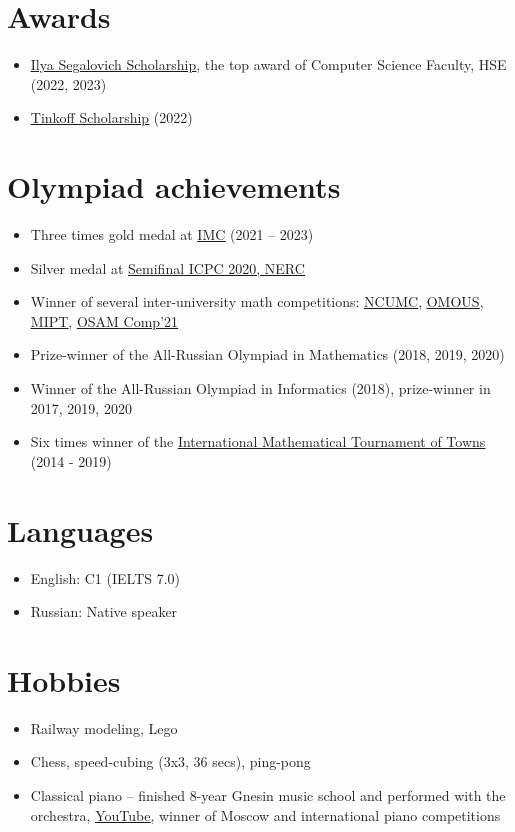 \documentclass[letterpaper,11pt]{article}
\newcommand{\resumeItemListStart}{\begin{itemize}}
\newcommand{\resumeItemListEnd}{\end{itemize}\vspace{-8pt}}
\newcommand{\resumeItem}[1]{\item\small{{#1 \vspace{-2pt}}}}
\newcommand{\resumeSubItem}[1]{\resumeItem{#1}\vspace{-4pt}}
\begin{document}
\section{Awards}

\resumeItemListStart
\resumeSubItem{\href{https://cs.hse.ru/en/stipend}{\underline{Ilya Segalovich Scholarship}}, the top award of Computer Science Faculty, HSE (2022, 2023)}
\resumeSubItem{\href{https://www.tinkoff.ru/about/news/06042022-tinkoff-launches-scholarship-programme-for-russias-young-talent-eng/}{\underline{Tinkoff Scholarship}} (2022)}
\resumeItemListEnd


\section{Olympiad achievements}

\resumeItemListStart
\resumeSubItem{Three times gold medal at \href{https://imc-math.org.uk}{\underline{IMC}} (2021 -- 2023)}
\resumeSubItem{Silver medal at \href{https://neerc.ifmo.ru/archive/2020.html}{\underline{Semifinal ICPC 2020, NERC}}}
\resumeSubItem{Winner of several inter-university math competitions: \href{https://iuhd.edu.tm/competition/44}{\underline{NCUMC}}, \href{https://iuhd.edu.tm/competition/45}{\underline{OMOUS}}, \href{http://www.rkarasev.ru/note/66}{\underline{MIPT}}, \href{https://cs.hse.ru/en/announcements/504365867.html}{\underline{OSAM Comp'21}}}
\resumeSubItem{Prize-winner of the All-Russian Olympiad in Mathematics (2018, 2019, 2020)}
\resumeSubItem{Winner of the All-Russian Olympiad in Informatics (2018), prize-winner in 2017, 2019, 2020}
\resumeSubItem{Six times winner of the \href{https://www.turgor.ru/en/}{\underline{International Mathematical Tournament of Towns}} (2014 - 2019)}
\resumeItemListEnd


\section{Languages}

\resumeItemListStart
\resumeSubItem{English: C1 (IELTS 7.0)}
\resumeSubItem{Russian: Native speaker}
\resumeItemListEnd


\section{Hobbies}

\resumeItemListStart
\resumeSubItem{Railway modeling, Lego}
\resumeSubItem{Chess, speed-cubing (3x3, 36 secs), ping-pong}
\resumeSubItem{Classical piano -- finished 8-year Gnesin music school and performed with the orchestra, \href{https://www.youtube.com/user/FeodorKuyanov/playlists}{\underline{YouTube}}, winner of Moscow and international piano competitions}
\resumeItemListEnd
\end{document}
